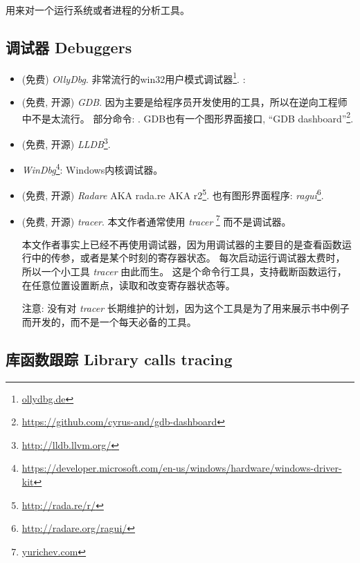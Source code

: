 \documentclass[UTF8,nofonts]{ctexart}
\begin{document}

用来对一个运行系统或者进程的分析工具。

\subsection{调试器 Debuggers}

\myindex{\olly}

\begin{itemize}
\item (免费) \emph{OllyDbg}.
非常流行的win32用户模式调试器\footnote{\href{http://go.yurichev.com/17032}{ollydbg.de}}.
\ShortHotKeyCheatsheet: 

\item (免费, 开源) \emph{GDB}.
因为主要是给程序员开发使用的工具，所以在逆向工程师中不是太流行。
部分命令: .
GDB也有一个图形界面接口, ``GDB dashboard''\footnote{\url{https://github.com/cyrus-and/gdb-dashboard}}.

\item (免费, 开源) \emph{LLDB}\footnote{\url{http://lldb.llvm.org/}}.

\item \emph{WinDbg}\footnote{\url{https://developer.microsoft.com/en-us/windows/hardware/windows-driver-kit}}:
Windows内核调试器。

\item (免费, 开源) \emph{Radare} \ac{AKA} rada.re \ac{AKA} r2\footnote{\url{http://rada.re/r/}}.
也有图形界面程序: \emph{ragui}\footnote{\url{http://radare.org/ragui/}}.

\item (免费, 开源) \emph{tracer}.
\label{tracer}
本文作者通常使用 \emph{tracer}
\footnote{\href{http://go.yurichev.com/17338}{yurichev.com}}
而不是调试器。

本文作者事实上已经不再使用调试器，因为用调试器的主要目的是查看函数运行中的传参，或者是某个时刻的寄存器状态。
每次启动运行调试器太费时，所以一个小工具 \emph{tracer} 由此而生。
这是个命令行工具，支持截断函数运行，在任意位置设置断点，读取和改变寄存器状态等。

注意: 没有对 \emph{tracer} 长期维护的计划，因为这个工具是为了用来展示书中例子而开发的，而不是一个每天必备的工具。
\end{itemize}

\subsection{库函数跟踪 Library calls tracing}
\end{document}
